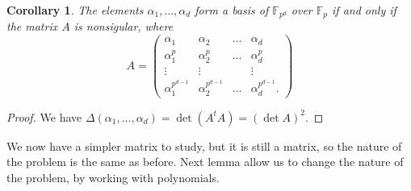 \documentclass[a4paper,11pt]{article}
\theoremstyle{break}
\newtheorem{cor}[thm]{Corollary}
\theoremstyle{sc}
\theoremstyle{definition}
\theoremstyle{remark}
\begin{document}
\begin{cor}
  \label{circulantCor}
 The elements $\alpha_1, \dots, \alpha_d$ form a basis of
 $\mathbb{F}_{p^d}$ over $\mathbb{F}_p$ if and only if the matrix $A$ is
 nonsigular, where
 \[
   A = 
   \begin{pmatrix}
     \alpha_1 & \alpha_2 & \dots & \alpha_d \\
     \alpha_1^p & \alpha_2^p & \dots & \alpha_d^p \\
     \vdots & \vdots & & \vdots \\
     \alpha_1^{p^{d-1}} & \alpha_2^{p^{d-1}} & \dots &
     \alpha_d^{p^{d-1}}.
   \end{pmatrix}
 \]
\end{cor}
\begin{proof}
  We have $\Delta(\alpha_1, \dots, \alpha_d)=\det(A^tA)=(\det A)^2$.   
\end{proof}

We now have a simpler matrix to study, but it is still a matrix, so the nature
of the problem is the same as before. Next lemma allow us to change the nature
of the problem, by working with polynomials.
\end{document}
